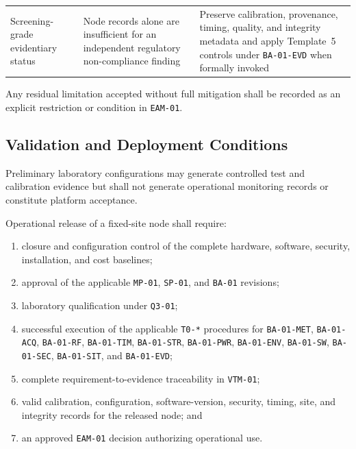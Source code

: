 \documentclass[11pt,a4paper]{article}
\begin{document}
\begin{longtable}{
			>{\raggedright\arraybackslash}p{3.0cm}
			>{\raggedright\arraybackslash}p{5.7cm}
			>{\raggedright\arraybackslash}p{5.0cm}}
		Screening-grade evidentiary status &
		Node records alone are insufficient for an independent regulatory
		non-compliance finding &
		Preserve calibration, provenance, timing, quality, and integrity
		metadata and apply Template~5 controls under \texttt{BA-01-EVD} when
		formally invoked \\
	\end{longtable}
	
	Any residual limitation accepted without full mitigation shall be recorded as
	an explicit restriction or condition in \texttt{EAM-01}.
	
	\subsection*{Validation and Deployment Conditions}
	
	Preliminary laboratory configurations may generate controlled test and
	calibration evidence but shall not generate operational monitoring records or
	constitute platform acceptance.
	
	Operational release of a fixed-site node shall require:
	
	\begin{enumerate}
		\item closure and configuration control of the complete hardware,
		software, security, installation, and cost baselines;
		\item approval of the applicable \texttt{MP-01}, \texttt{SP-01}, and
		\texttt{BA-01} revisions;
		\item laboratory qualification under \texttt{Q3-01};
		\item successful execution of the applicable \texttt{T0-*} procedures for
		\texttt{BA-01-MET}, \texttt{BA-01-ACQ}, \texttt{BA-01-RF},
		\texttt{BA-01-TIM}, \texttt{BA-01-STR}, \texttt{BA-01-PWR},
		\texttt{BA-01-ENV}, \texttt{BA-01-SW}, \texttt{BA-01-SEC},
		\texttt{BA-01-SIT}, and \texttt{BA-01-EVD};
		\item complete requirement-to-evidence traceability in
		\texttt{VTM-01};
		\item valid calibration, configuration, software-version, security,
		timing, site, and integrity records for the released node; and
		\item an approved \texttt{EAM-01} decision authorizing operational use.
	\end{enumerate}
	
\end{document}
